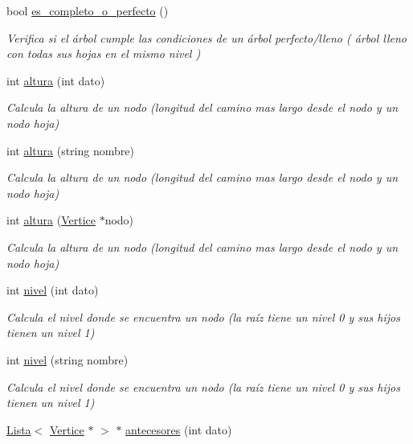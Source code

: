 \begin{DoxyCompactItemize}
bool \hyperlink{classArbol_a9e472df85f3bb1aa5c90f8157ad6ff22}{es\+\_\+completo\+\_\+o\+\_\+perfecto} ()
\begin{DoxyCompactList}\small\item\em Verifica si el árbol cumple las condiciones de un árbol perfecto/lleno ( árbol lleno con todas sus hojas en el mismo nivel ) \end{DoxyCompactList}\item 
int \hyperlink{classArbol_a98151655f0dab81b40d34f87fbbd90cd}{altura} (int dato)
\begin{DoxyCompactList}\small\item\em Calcula la altura de un nodo (longitud del camino mas largo desde el nodo y un nodo hoja) \end{DoxyCompactList}\item 
int \hyperlink{classArbol_a7a79cb43ca30b5120f1a8ebe3afbe22c}{altura} (string nombre)
\begin{DoxyCompactList}\small\item\em Calcula la altura de un nodo (longitud del camino mas largo desde el nodo y un nodo hoja) \end{DoxyCompactList}\item 
int \hyperlink{classArbol_a9f8928b4c72e2d484ef75cf3633c22ce}{altura} (\hyperlink{classVertice}{Vertice} $\ast$nodo)
\begin{DoxyCompactList}\small\item\em Calcula la altura de un nodo (longitud del camino mas largo desde el nodo y un nodo hoja) \end{DoxyCompactList}\item 
int \hyperlink{classArbol_accd2dd2f8012067c1a2d77fd14c64546}{nivel} (int dato)
\begin{DoxyCompactList}\small\item\em Calcula el nivel donde se encuentra un nodo (la raíz tiene un nivel 0 y sus hijos tienen un nivel 1) \end{DoxyCompactList}\item 
int \hyperlink{classArbol_a3a8a414e8e3f45bf90c481649928a86d}{nivel} (string nombre)
\begin{DoxyCompactList}\small\item\em Calcula el nivel donde se encuentra un nodo (la raíz tiene un nivel 0 y sus hijos tienen un nivel 1) \end{DoxyCompactList}\item 
\hyperlink{classLista}{Lista}$<$ \hyperlink{classVertice}{Vertice} $\ast$ $>$ $\ast$ \hyperlink{classArbol_ac7ff5e2f436a1e83e24cbdd0b2cc827b}{antecesores} (int dato)

\end{DoxyCompactItemize}

